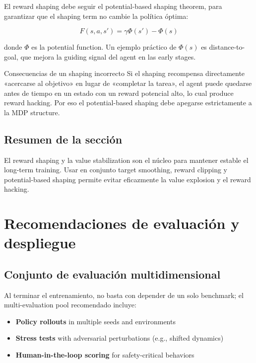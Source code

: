 \documentclass[a4paper]{article}
\begin{document}
El reward shaping debe seguir el potential-based shaping theorem, para garantizar que el shaping term no cambie la política óptima:

$$F(s, a, s') = \gamma \Phi(s') - \Phi(s)$$

donde $\Phi$ es la potential function. Un ejemplo práctico de $\Phi(s)$ es distance-to-goal, que mejora la guiding signal del agent en las early stages.

\begin{warningbox}{Consecuencias de un shaping incorrecto}
Si el shaping recompensa directamente «acercarse al objetivo» en lugar de «completar la tarea», el agent puede quedarse antes de tiempo en un estado con un reward potencial alto, lo cual produce reward hacking. Por eso el potential-based shaping debe apegarse estrictamente a la MDP structure.
\end{warningbox}

\subsection{Resumen de la sección}

El reward shaping y la value stabilization son el núcleo para mantener estable el long-term training. Usar en conjunto target smoothing, reward clipping y potential-based shaping permite evitar eficazmente la value explosion y el reward hacking.

\section{Recomendaciones de evaluación y despliegue}

\subsection{Conjunto de evaluación multidimensional}

Al terminar el entrenamiento, no basta con depender de un solo benchmark; el multi-evaluation pool recomendado incluye:

\begin{itemize}
    \item \textbf{Policy rollouts} in multiple seeds and environments
    \item \textbf{Stress tests} with adversarial perturbations (e.g., shifted dynamics)
    \item \textbf{Human-in-the-loop scoring} for safety-critical behaviors
\end{itemize}
\end{document}

